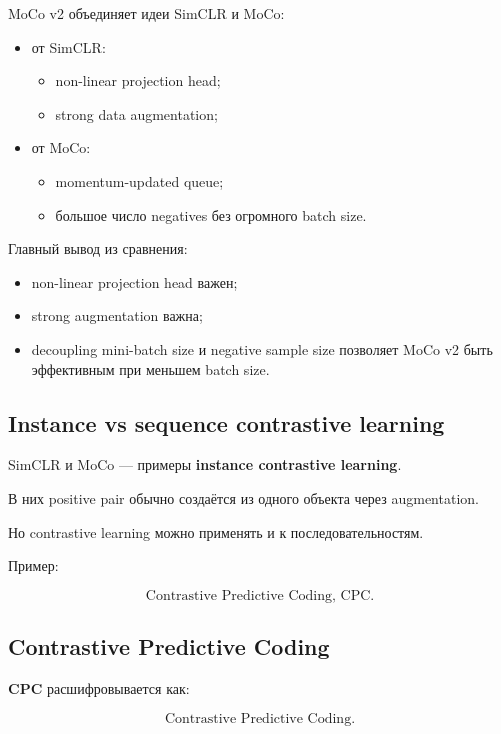 \documentclass[a4paper,12pt]{article}
\begin{document}
MoCo v2 объединяет идеи SimCLR и MoCo:

\begin{itemize}
    \item от SimCLR:
    \begin{itemize}
        \item non-linear projection head;
        \item strong data augmentation;
    \end{itemize}

    \item от MoCo:
    \begin{itemize}
        \item momentum-updated queue;
        \item большое число negatives без огромного batch size.
    \end{itemize}
\end{itemize}

Главный вывод из сравнения:

\begin{itemize}
    \item non-linear projection head важен;
    \item strong augmentation важна;
    \item decoupling mini-batch size и negative sample size позволяет MoCo v2 быть эффективным при меньшем batch size.
\end{itemize}

\subsection{Instance vs sequence contrastive learning}

SimCLR и MoCo --- примеры \textbf{instance contrastive learning}.

В них positive pair обычно создаётся из одного объекта через augmentation.

Но contrastive learning можно применять и к последовательностям.

Пример:

\[
\text{Contrastive Predictive Coding, CPC}.
\]

\subsection{Contrastive Predictive Coding}

\textbf{CPC} расшифровывается как:

\[
\text{Contrastive Predictive Coding}.
\]
\end{document}

